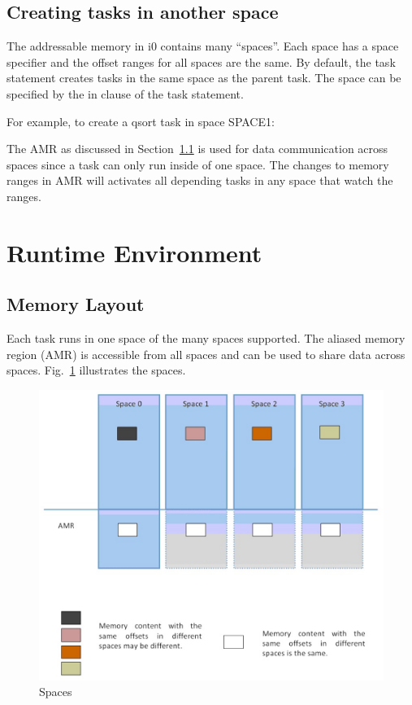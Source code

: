 \documentclass[a4paper]{article}
\begin{document}
{{\subsection{Creating tasks in another space}}}

The addressable memory in i0 contains many ``spaces''. Each space has a space specifier and the offset ranges for all spaces are the same. By default, the task statement creates tasks in the same space as the parent task. The space can be specified by the in clause of the task statement.

For example, to create a qsort task in space SPACE1:

{\color{blue}{}}

The AMR as discussed in Section~\ref{mem-layout} is used for data communication across spaces since a task can only run inside of one space. The changes to memory ranges in AMR will activates all depending tasks in any space that watch the ranges.

{\section{Runtime Environment}}

\subsection{Memory Layout}
\label{mem-layout}

Each task runs in one space of the many spaces supported. The aliased memory region (AMR) is accessible from all spaces and can be used to share data across spaces. Fig.~\ref{fig:c0-spaces} illustrates the spaces.

\begin{figure}[htbp]
\begin{center}
  \includegraphics[width=14cm]{figure/spaces.eps}
  \caption{Spaces}
  \label{fig:c0-spaces}
\end{center}
\end{figure}
\end{document}
